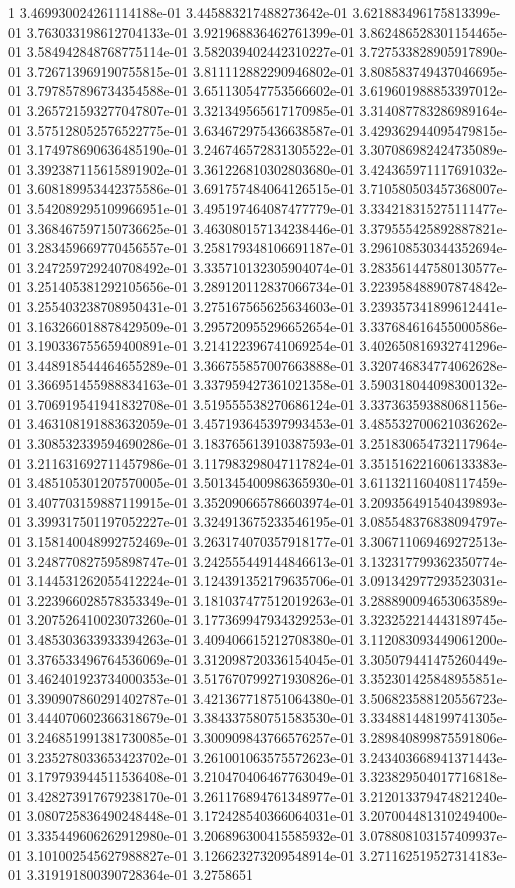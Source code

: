 1	3.469930024261114188e-01	3.445883217488273642e-01	3.621883496175813399e-01	3.763033198612704133e-01	3.921968836462761399e-01	3.862486528301154465e-01	3.584942848768775114e-01	3.582039402442310227e-01	3.727533828905917890e-01	3.726713969190755815e-01	3.811112882290946802e-01	3.808583749437046695e-01	3.797857896734354588e-01	3.651130547753566602e-01	3.619601988853397012e-01	3.265721593277047807e-01	3.321349565617170985e-01	3.314087783286989164e-01	3.575128052576522775e-01	3.634672975436638587e-01	3.429362944095479815e-01	3.174978690636485190e-01	3.246746572831305522e-01	3.307086982424735089e-01	3.392387115615891902e-01	3.361226810302803680e-01	3.424365971117691032e-01	3.608189953442375586e-01	3.691757484064126515e-01	3.710580503457368007e-01	3.542089295109966951e-01	3.495197464087477779e-01	3.334218315275111477e-01	3.368467597150736625e-01	3.463080157134238446e-01	3.379555425892887821e-01	3.283459669770456557e-01	3.258179348106691187e-01	3.296108530344352694e-01	3.247259729240708492e-01	3.335710132305904074e-01	3.283561447580130577e-01	3.251405381292105656e-01	3.289120112837066734e-01	3.223958488907874842e-01	3.255403238708950431e-01	3.275167565625634603e-01	3.239357341899612441e-01	3.163266018878429509e-01	3.295720955296652654e-01	3.337684616455000586e-01	3.190336755659400891e-01	3.214122396741069254e-01	3.402650816932741296e-01	3.448918544464655289e-01	3.366755857007663888e-01	3.320746834774062628e-01	3.366951455988834163e-01	3.337959427361021358e-01	3.590318044098300132e-01	3.706919541941832708e-01	3.519555538270686124e-01	3.337363593880681156e-01	3.463108191883632059e-01	3.457193645397993453e-01	3.485532700621036262e-01	3.308532339594690286e-01	3.183765613910387593e-01	3.251830654732117964e-01	3.211631692711457986e-01	3.117983298047117824e-01	3.351516221606133383e-01	3.485105301207570005e-01	3.501345400986365930e-01	3.611321160408117459e-01	3.407703159887119915e-01	3.352090665786603974e-01	3.209356491540439893e-01	3.399317501197052227e-01	3.324913675233546195e-01	3.085548376838094797e-01	3.158140048992752469e-01	3.263174070357918177e-01	3.306711069469272513e-01	3.248770827595898747e-01	3.242555449144846613e-01	3.132317799362350774e-01	3.144531262055412224e-01	3.124391352179635706e-01	3.091342977293523031e-01	3.223966028578353349e-01	3.181037477512019263e-01	3.288890094653063589e-01	3.207526410023073260e-01	3.177369947934329253e-01	3.323252214443189745e-01	3.485303633933394263e-01	3.409406615212708380e-01	3.112083093449061200e-01	3.376533496764536069e-01	3.312098720336154045e-01	3.305079441475260449e-01	3.462401923734000353e-01	3.517670799271930826e-01	3.352301425848955851e-01	3.390907860291402787e-01	3.421367718751064380e-01	3.506823588120556723e-01	3.444070602366318679e-01	3.384337580751583530e-01	3.334881448199741305e-01	3.246851991381730085e-01	3.300909843766576257e-01	3.289840899875591806e-01	3.235278033653423702e-01	3.261001063575572623e-01	3.243403668941371443e-01	3.179793944511536408e-01	3.210470406467763049e-01	3.323829504017716818e-01	3.428273917679238170e-01	3.261176894761348977e-01	3.212013379474821240e-01	3.080725836490248448e-01	3.172428540366064031e-01	3.207004481310249400e-01	3.335449606262912980e-01	3.206896300415585932e-01	3.078808103157409937e-01	3.101002545627988827e-01	3.126623273209548914e-01	3.271162519527314183e-01	3.319191800390728364e-01	3.2758651